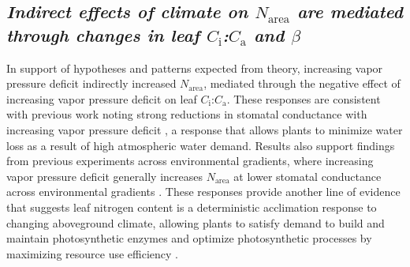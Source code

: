 \begin{singlespace}
\subsection{\textit{Indirect effects of climate on $N_\mathrm{area}$ are mediated through changes in leaf $C_\mathrm{i}$:$C_\mathrm{a}$ and $\beta$}}
\end{singlespace}
\noindent In support of hypotheses and patterns expected from theory, increasing vapor pressure deficit indirectly increased $N_\mathrm{area}$, mediated through the negative effect of increasing vapor pressure deficit on leaf $C_\mathrm{i}$:$C_\mathrm{a}$. These responses are consistent with previous work noting strong reductions in stomatal conductance with increasing vapor pressure deficit , a response that allows plants to minimize water loss as a result of high atmospheric water demand. Results also support findings from previous experiments across environmental gradients, where increasing vapor pressure deficit generally increases $N_\mathrm{area}$ at lower stomatal conductance across environmental gradients . These responses provide another line of evidence that suggests leaf nitrogen content is a deterministic acclimation response to changing aboveground climate, allowing plants to satisfy demand to build and maintain photosynthetic enzymes and optimize photosynthetic processes by maximizing resource use efficiency .


